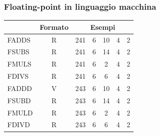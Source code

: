 \documentclass[12pt,a4paper]{article}
\begin{document}
\subsubsection{Floating-point in linguaggio macchina}
\Sep\begin{center}
\begin{tabular}{|l|c|ccccc|}
\hline
\rowcolor[HTML]{FFCB2F} 
\multicolumn{1}{|c|}{\cellcolor[HTML]{FFCB2F}Nome} & Formato & \multicolumn{5}{c|}{\cellcolor[HTML]{FFCB2F}Esempi}                                                                                     \\ \hline
FADDS                                              & R       & \multicolumn{1}{c|}{241}     & \multicolumn{1}{c|}{6}          & \multicolumn{1}{c|}{10}         & \multicolumn{1}{c|}{4}      & 2      \\ \hline
FSUBS                                              & R       & \multicolumn{1}{c|}{241}     & \multicolumn{1}{c|}{6}          & \multicolumn{1}{c|}{14}         & \multicolumn{1}{c|}{4}      & 2      \\ \hline
FMULS                                              & R       & \multicolumn{1}{c|}{241}     & \multicolumn{1}{c|}{6}          & \multicolumn{1}{c|}{2}          & \multicolumn{1}{c|}{4}      & 2      \\ \hline
FDIVS                                              & R       & \multicolumn{1}{c|}{241}     & \multicolumn{1}{c|}{6}          & \multicolumn{1}{c|}{6}          & \multicolumn{1}{c|}{4}      & 2      \\ \hline
FADDD                                              & V       & \multicolumn{1}{c|}{243}     & \multicolumn{1}{c|}{6}          & \multicolumn{1}{c|}{10}         & \multicolumn{1}{c|}{4}      & 2      \\ \hline
FSUBD                                              & R       & \multicolumn{1}{c|}{243}     & \multicolumn{1}{c|}{6}          & \multicolumn{1}{c|}{14}         & \multicolumn{1}{c|}{4}      & 2      \\ \hline
FMULD                                              & R       & \multicolumn{1}{c|}{243}     & \multicolumn{1}{c|}{6}          & \multicolumn{1}{c|}{2}          & \multicolumn{1}{c|}{4}      & 2      \\ \hline
FDIVD                                              & R       & \multicolumn{1}{c|}{243}     & \multicolumn{1}{c|}{6}          & \multicolumn{1}{c|}{6}          & \multicolumn{1}{c|}{4}      & 2      \\ \hline

\end{tabular}
\end{center}
\end{document}
